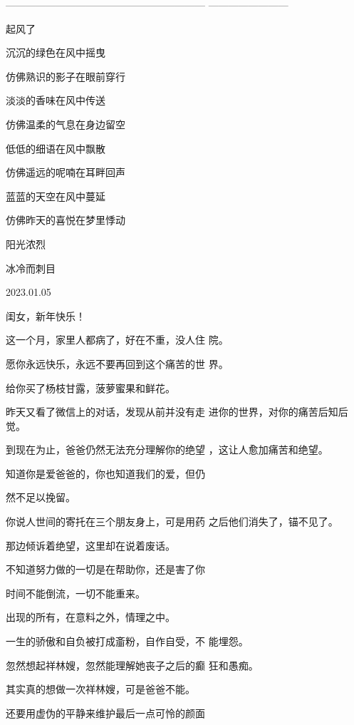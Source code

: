 \documentclass{article}
\begin{document}
————————————————————
———————— 


起风了 


沉沉的绿色在风中摇曳 


仿佛熟识的影子在眼前穿行 




\newpage

淡淡的香味在风中传送 


仿佛温柔的气息在身边留空 




低低的细语在风中飘散 


仿佛遥远的呢喃在耳畔回声 




蓝蓝的天空在风中蔓延 


仿佛昨天的喜悦在梦里悸动 




阳光浓烈 


冰冷而刺目 

\newpage



2023.01.05 


闺女，新年快乐！ 

这一个月，家里人都病了，好在不重，没人住
院。 

愿你永远快乐，永远不要再回到这个痛苦的世
界。 


给你买了杨枝甘露，菠萝蜜果和鲜花。 

昨天又看了微信上的对话，发现从前并没有走
进你的世界，对你的痛苦后知后觉。 

到现在为止，爸爸仍然无法充分理解你的绝望
，这让人愈加痛苦和绝望。 

知道你是爱爸爸的，你也知道我们的爱，但仍

\newpage
然不足以挽留。 

你说人世间的寄托在三个朋友身上，可是用药
之后他们消失了，锚不见了。 


那边倾诉着绝望，这里却在说着废话。 

不知道努力做的一切是在帮助你，还是害了你


时间不能倒流，一切不能重来。 


出现的所有，在意料之外，情理之中。 

一生的骄傲和自负被打成齑粉，自作自受，不
能埋怨。 

忽然想起祥林嫂，忽然能理解她丧子之后的癫
狂和愚痴。 


其实真的想做一次祥林嫂，可是爸爸不能。 

还要用虚伪的平静来维护最后一点可怜的颜面
\newpage
\end{document}
